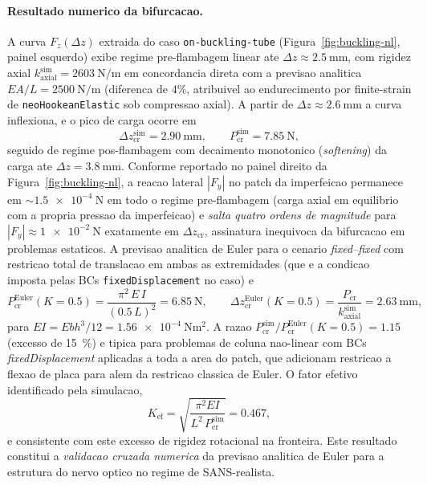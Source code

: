 \paragraph{Resultado numerico da bifurcacao.} A curva $F_z(\Delta z)$ extraida do caso \texttt{on-buckling-tube} (Figura~\ref{fig:buckling-nl}, painel esquerdo) exibe regime pre-flambagem linear ate $\Delta z \approx \SI{2.5}{\milli\meter}$, com rigidez axial $k_{\mathrm{axial}}^{\mathrm{sim}} = \SI{2603}{\newton\per\meter}$ em concordancia direta com a previsao analitica $E A / L = \SI{2500}{\newton\per\meter}$ (diferenca de $4\%$, atribuivel ao endurecimento por finite-strain de \texttt{neoHookeanElastic} sob compressao axial). A partir de $\Delta z \approx \SI{2.6}{\milli\meter}$ a curva inflexiona, e o pico de carga ocorre em
\begin{equation}
  \Delta z_{\mathrm{cr}}^{\mathrm{sim}} = \SI{2.90}{\milli\meter},
  \qquad
  P_{\mathrm{cr}}^{\mathrm{sim}} = \SI{7.85}{\newton},
  \label{eq:Pcr-sim}
\end{equation}
seguido de regime pos-flambagem com decaimento monotonico (\emph{softening}) da carga ate $\Delta z = \SI{3.8}{\milli\meter}$. Conforme reportado no painel direito da Figura~\ref{fig:buckling-nl}, a reacao lateral $|F_y|$ no patch da imperfeicao permanece em $\sim \SI{1.5e-4}{\newton}$ em todo o regime pre-flambagem (carga axial em equilibrio com a propria pressao da imperfeicao) e \emph{salta quatro ordens de magnitude} para $|F_y| \approx \SI{1e-2}{\newton}$ exatamente em $\Delta z_{\mathrm{cr}}$, assinatura inequivoca da bifurcacao em problemas estaticos. A previsao analitica de Euler para o cenario \emph{fixed--fixed} com restricao total de translacao em ambas as extremidades (que e a condicao imposta pelas BCs \texttt{fixedDisplacement} no caso) e
\begin{equation}
  P_{\mathrm{cr}}^{\mathrm{Euler}}(K=0.5) = \frac{\pi^2\, E\, I}{(0.5\, L)^2} = \SI{6.85}{\newton},
  \qquad
  \Delta z_{\mathrm{cr}}^{\mathrm{Euler}}(K=0.5) = \frac{P_{\mathrm{cr}}}{k_{\mathrm{axial}}^{\mathrm{sim}}} = \SI{2.63}{\milli\meter},
  \label{eq:Pcr-Euler-K05}
\end{equation}
para $E I = E b h^3/12 = \SI{1.56e-4}{\newton\meter\squared}$. A razao $P_{\mathrm{cr}}^{\mathrm{sim}}/P_{\mathrm{cr}}^{\mathrm{Euler}}(K=0.5) = 1.15$ (excesso de \SI{15}{\percent}) e tipica para problemas de coluna nao-linear com BCs \emph{fixedDisplacement} aplicadas a toda a area do patch, que adicionam restricao a flexao de placa para alem da restricao classica de Euler. O fator efetivo identificado pela simulacao,
\begin{equation}
  K_{\mathrm{ef}} = \sqrt{\frac{\pi^2 E I}{L^2\, P_{\mathrm{cr}}^{\mathrm{sim}}}} = 0.467,
  \label{eq:Kef}
\end{equation}
e consistente com este excesso de rigidez rotacional na fronteira. Este resultado constitui a \emph{validacao cruzada numerica} da previsao analitica de Euler para a estrutura do nervo optico no regime de SANS-realista.

